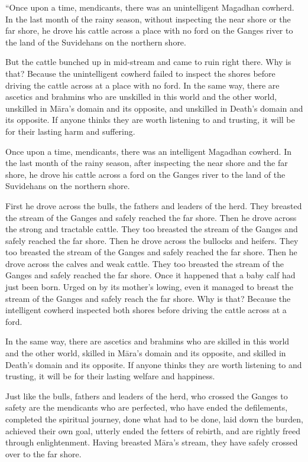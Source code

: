 \documentclass[12pt,openany]{book}%
\begin{document}
“Once upon a time, mendicants, there was an unintelligent Magadhan cowherd. In the last month of the rainy season, without inspecting the near shore or the far shore, he drove his cattle across a place with no ford on the Ganges river to the land of the Suvidehans on the northern shore. 

But the cattle bunched up in mid-stream and came to ruin right there. Why is that? Because the unintelligent cowherd failed to inspect the shores before driving the cattle across at a place with no ford. In the same way, there are ascetics and brahmins who are unskilled in this world and the other world, unskilled in \textsanskrit{Māra}’s domain and its opposite, and unskilled in Death’s domain and its opposite. If anyone thinks they are worth listening to and trusting, it will be for their lasting harm and suffering. 

Once upon a time, mendicants, there was an intelligent Magadhan cowherd. In the last month of the rainy season, after inspecting the near shore and the far shore, he drove his cattle across a ford on the Ganges river to the land of the Suvidehans on the northern shore. 

First he drove across the bulls, the fathers and leaders of the herd. They breasted the stream of the Ganges and safely reached the far shore. Then he drove across the strong and tractable cattle. They too breasted the stream of the Ganges and safely reached the far shore. Then he drove across the bullocks and heifers. They too breasted the stream of the Ganges and safely reached the far shore. Then he drove across the calves and weak cattle. They too breasted the stream of the Ganges and safely reached the far shore. Once it happened that a baby calf had just been born. Urged on by its mother’s lowing, even it managed to breast the stream of the Ganges and safely reach the far shore. Why is that? Because the intelligent cowherd inspected both shores before driving the cattle across at a ford. 

In the same way, there are ascetics and brahmins who are skilled in this world and the other world, skilled in \textsanskrit{Māra}’s domain and its opposite, and skilled in Death’s domain and its opposite. If anyone thinks they are worth listening to and trusting, it will be for their lasting welfare and happiness. 

Just like the bulls, fathers and leaders of the herd, who crossed the Ganges to safety are the mendicants who are perfected, who have ended the defilements, completed the spiritual journey, done what had to be done, laid down the burden, achieved their own goal, utterly ended the fetters of rebirth, and are rightly freed through enlightenment. Having breasted \textsanskrit{Māra}’s stream, they have safely crossed over to the far shore. 
\end{document}
